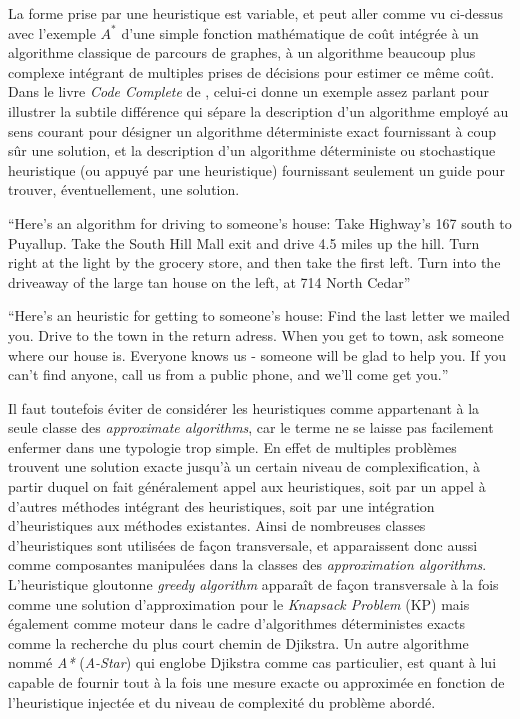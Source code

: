 La forme prise par une heuristique est variable, et peut aller comme vu ci-dessus avec l'exemple $A^*$ d'une simple fonction mathématique de coût intégrée à un algorithme classique de parcours de graphes, à un algorithme beaucoup plus complexe intégrant de multiples prises de décisions pour estimer ce même coût. Dans le livre \textit{Code Complete} de \textcite[12]{McConnell2004}, celui-ci donne un exemple assez parlant pour illustrer la subtile différence qui sépare la description d'un algorithme employé au sens courant pour désigner un algorithme déterministe exact fournissant à coup sûr une solution, et la description d'un algorithme déterministe ou stochastique heuristique (ou appuyé par une heuristique) fournissant seulement un guide pour trouver, éventuellement, une solution.

\foreignquote{english}{Here's an algorithm for driving to someone's house: Take Highway's 167 south to Puyallup. Take the South Hill Mall exit and drive 4.5 miles up the hill. Turn right at the light by the grocery store, and then take the first left. Turn into the driveaway of the large tan house on the left, at 714 North Cedar}

\foreignquote{english}{Here's an heuristic for getting to someone's house: Find the last letter we mailed you. Drive to the town in the return adress. When you get to town, ask someone where our house is. Everyone knows us - someone will be glad to help you. If you can't find anyone, call us from a public phone, and we'll come get you.}

Il faut toutefois éviter de considérer les heuristiques comme appartenant à la seule classe des \textit{approximate algorithms}, car le terme ne se laisse pas facilement enfermer dans une typologie trop simple. En effet de multiples problèmes trouvent une solution exacte jusqu'à un certain niveau de complexification, à partir duquel on fait généralement appel aux heuristiques, soit par un appel à d'autres méthodes intégrant des heuristiques, soit par une intégration d'heuristiques aux méthodes existantes. Ainsi de nombreuses classes d'heuristiques sont utilisées de façon transversale, et apparaissent donc aussi comme composantes manipulées dans la classes des \textit{approximation algorithms}. L'heuristique gloutonne \textit{greedy algorithm}  apparaît de façon transversale à la fois comme une solution d'approximation pour le \textit{Knapsack Problem} (KP) mais également comme moteur dans le cadre d'algorithmes déterministes exacts comme la recherche du plus court chemin de Djikstra. Un autre algorithme nommé \textit{A*} (\textit{A-Star}) qui englobe Djikstra comme cas particulier, est quant à lui capable de fournir tout à la fois une mesure exacte ou approximée en fonction de l'heuristique injectée et du niveau de complexité du problème abordé. 

